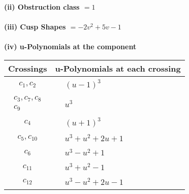 \documentclass[1p]{elsarticle_modified}
\theoremstyle{definition}
\begin{document}
\flushleft \textbf{(ii) Obstruction class $= 1$}\\~\\
\flushleft \textbf{(iii) Cusp Shapes $= -2 v^2+5 v-1$}\\~\\
\newpage\renewcommand{\arraystretch}{1}
\flushleft \textbf{(iv) u-Polynomials at the component}\newline \\
\begin{tabular}{m{50pt}|m{274pt}}
Crossings & \hspace{64pt}u-Polynomials at each crossing \\
\hline $$\begin{aligned}c_{1},c_{2}\end{aligned}$$&$\begin{aligned}
&(u-1)^3
\end{aligned}$\\
\hline $$\begin{aligned}c_{3},c_{7},c_{8}\\c_{9}\end{aligned}$$&$\begin{aligned}
&u^3
\end{aligned}$\\
\hline $$\begin{aligned}c_{4}\end{aligned}$$&$\begin{aligned}
&(u+1)^3
\end{aligned}$\\
\hline $$\begin{aligned}c_{5},c_{10}\end{aligned}$$&$\begin{aligned}
&u^3+u^2+2 u+1
\end{aligned}$\\
\hline $$\begin{aligned}c_{6}\end{aligned}$$&$\begin{aligned}
&u^3- u^2+1
\end{aligned}$\\
\hline $$\begin{aligned}c_{11}\end{aligned}$$&$\begin{aligned}
&u^3+u^2-1
\end{aligned}$\\
\hline $$\begin{aligned}c_{12}\end{aligned}$$&$\begin{aligned}
&u^3- u^2+2 u-1
\end{aligned}$\\
\hline
\end{tabular}\\~\\
\end{document}
